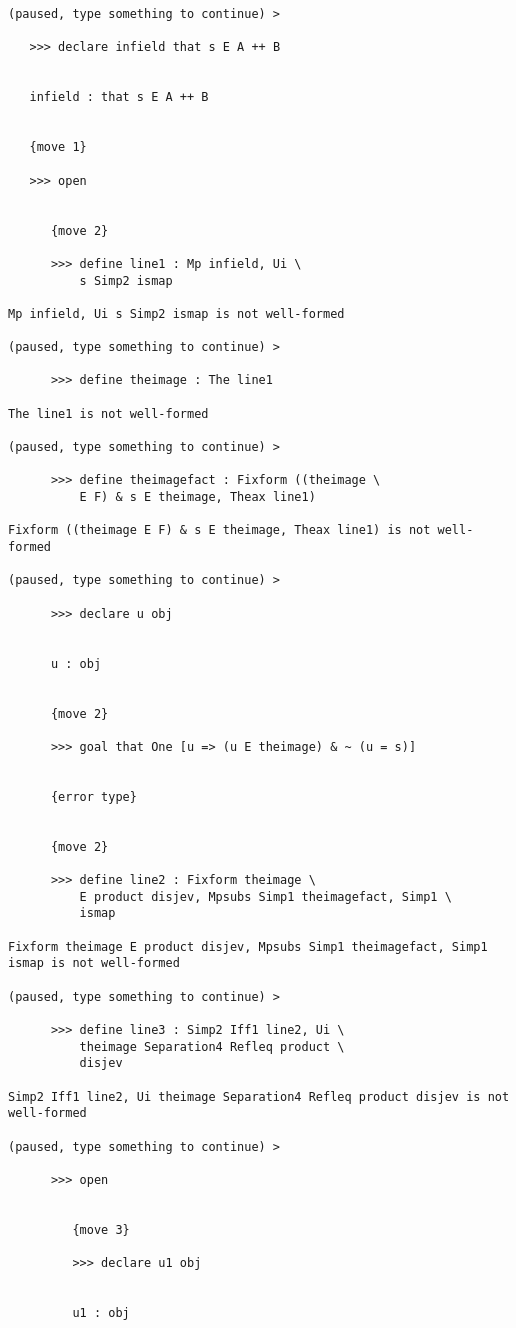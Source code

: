 \documentclass[12pt]{article}
\begin{document}
\begin{verbatim}
(paused, type something to continue) >

   >>> declare infield that s E A ++ B


   infield : that s E A ++ B


   {move 1}

   >>> open


      {move 2}

      >>> define line1 : Mp infield, Ui \
          s Simp2 ismap

Mp infield, Ui s Simp2 ismap is not well-formed

(paused, type something to continue) >

      >>> define theimage : The line1

The line1 is not well-formed

(paused, type something to continue) >

      >>> define theimagefact : Fixform ((theimage \
          E F) & s E theimage, Theax line1)

Fixform ((theimage E F) & s E theimage, Theax line1) is not well-formed

(paused, type something to continue) >

      >>> declare u obj


      u : obj


      {move 2}

      >>> goal that One [u => (u E theimage) & ~ (u = s)]


      {error type}


      {move 2}

      >>> define line2 : Fixform theimage \
          E product disjev, Mpsubs Simp1 theimagefact, Simp1 \
          ismap

Fixform theimage E product disjev, Mpsubs Simp1 theimagefact, Simp1 ismap is not well-formed

(paused, type something to continue) >

      >>> define line3 : Simp2 Iff1 line2, Ui \
          theimage Separation4 Refleq product \
          disjev

Simp2 Iff1 line2, Ui theimage Separation4 Refleq product disjev is not well-formed

(paused, type something to continue) >

      >>> open


         {move 3}

         >>> declare u1 obj


         u1 : obj



\end{verbatim}
\end{document}
